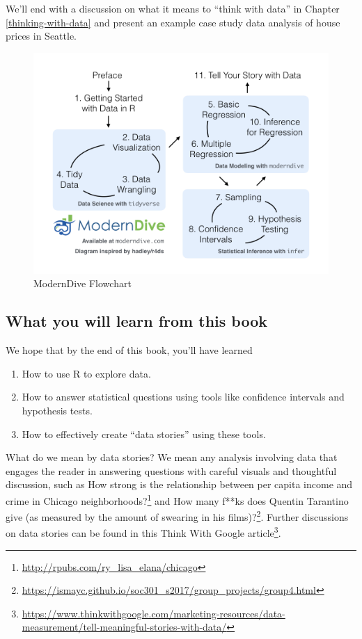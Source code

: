 \documentclass[12pt,]{krantz}
\providecommand{\tightlist}{%
  \setlength{\itemsep}{0pt}\setlength{\parskip}{0pt}}
\renewcommand{\href}[2]{#2\footnote{\url{#1}}}
\theoremstyle{definition}
\theoremstyle{definition}
\theoremstyle{definition}
\theoremstyle{remark}
\begin{document}
We'll end with a discussion on what it means to ``think with data'' in
Chapter \ref{thinking-with-data} and present an example case study data
analysis of house prices in Seattle.

\begin{figure}

{\centering \includegraphics[width=\textwidth]{images/flowcharts/flowchart/flowchart.002} 

}

\caption{ModernDive Flowchart}\label{fig:moderndive-figure}
\end{figure}

\subsection{What you will learn from this
book}\label{subsec:learning-goals}

We hope that by the end of this book, you'll have learned

\begin{enumerate}
\def\labelenumi{\arabic{enumi}.}
\tightlist
\item
  How to use R to explore data.\\
\item
  How to answer statistical questions using tools like confidence
  intervals and hypothesis tests.
\item
  How to effectively create ``data stories'' using these tools.
\end{enumerate}

What do we mean by data stories? We mean any analysis involving data
that engages the reader in answering questions with careful visuals and
thoughtful discussion, such as
\href{http://rpubs.com/ry_lisa_elana/chicago}{How strong is the
relationship between per capita income and crime in Chicago
neighborhoods?} and
\href{https://ismayc.github.io/soc301_s2017/group_projects/group4.html}{How
many f**ks does Quentin Tarantino give (as measured by the amount of
swearing in his films)?}. Further discussions on data stories can be
found in this
\href{https://www.thinkwithgoogle.com/marketing-resources/data-measurement/tell-meaningful-stories-with-data/}{Think
With Google article}.
\end{document}
